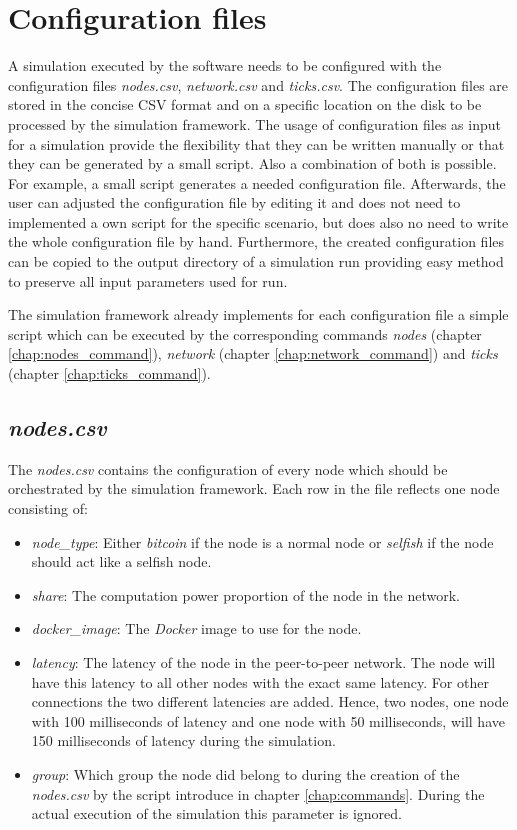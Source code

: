 \section{Configuration files}
\label{chap:config_files}

A simulation executed by the software needs to be configured with the configuration files \textit{nodes.csv}, \textit{network.csv} and \textit{ticks.csv}.
The configuration files are stored in the concise CSV format and on a specific location on the disk to be processed by the simulation framework.
The usage of configuration files as input for a simulation provide the flexibility that they can be written manually or that they can be generated by a small script.
Also a combination of both is possible.
For example, a small script generates a needed configuration file.
Afterwards, the user can adjusted the configuration file by editing it and does not need to implemented a own script for the specific scenario, but does also no need to write the whole configuration file by hand.
Furthermore, the created configuration files can be copied to the output directory of a simulation run providing easy method to preserve all input parameters used for run.

The simulation framework already implements for each configuration file a simple script which can be executed by the corresponding commands \textit{nodes} (chapter \ref{chap:nodes_command}), \textit{network} (chapter \ref{chap:network_command}) and \textit{ticks} (chapter \ref{chap:ticks_command}).

\subsection{\textit{nodes.csv}}

The \textit{nodes.csv} contains the configuration of every node which should be orchestrated by the simulation framework.
Each row in the file reflects one node consisting of:
\begin{itemize}
	\item \textit{node\_type}: Either \textit{bitcoin} if the node is a normal node or \textit{selfish} if the node should act like a selfish node.
	\item \textit{share}: The computation power proportion of the node in the network.
	\item \textit{docker\_image}: The \textit{Docker} image to use for the node.
	\item \textit{latency}: The latency  of the node in the peer-to-peer network.
	The node will have this latency to all other nodes with the exact same latency.
	For other connections the two different latencies are added.
	Hence, two nodes, one node with 100 milliseconds of latency and one node with 50 milliseconds, will have 150 milliseconds of latency during the simulation.
	\item \textit{group}: Which group the node did belong to during the creation of the \textit{nodes.csv} by the script introduce in chapter \ref{chap:commands}.
	During the actual execution of the simulation this parameter is ignored.
\end{itemize}
 
